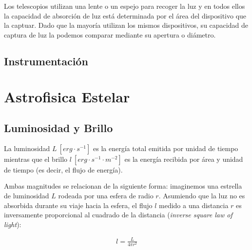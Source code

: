\documentclass{tufte-handout}
\begin{document}
Los telescopios utilizan una lente o un espejo para recoger la luz y en todos ellos la capacidad de absorción de luz está determinada por el área del dispositivo que la captuar. Dado que la mayoría utilizan los mismos dispositivos, su capacidad de captura de luz la podemos comparar mediante su apertura o diámetro.

\subsection{Instrumentación}

\clearpage

\section{Astrofisica Estelar}

\subsection{Luminosidad y Brillo}

La luminosidad $L~[erg \cdot s^{-1}]$ es la energía total emitida por unidad de tiempo mientras que el brillo $l~[erg \cdot s^{-1} \cdot m^{-2}]$ es la energía recibida por área y unidad de tiempo (es decir, el flujo de energía).


Ambas magnitudes se relacionan de la siguiente forma: imaginemos una estrella de luminosidad $L$ rodeada por una esfera de radio $r$. Asumiendo que la luz no es absorbida durante su viaje hacia la esfera, el flujo $l$ medido a una distancia $r$ es inversamente proporcional al cuadrado de la distancia (\emph{inverse square law of light}):

\begin{align}
  l = \frac{L}{4\pi r^2}
\end{align}
\end{document}
